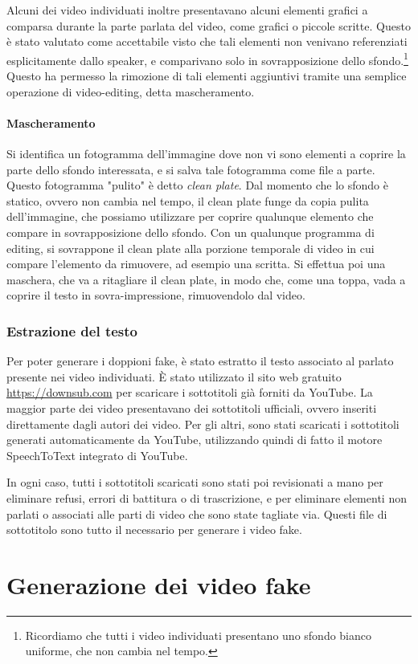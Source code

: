Alcuni dei video individuati inoltre presentavano alcuni elementi grafici a comparsa durante la parte parlata del video, come grafici o piccole scritte. Questo è stato valutato come accettabile visto che tali elementi non venivano referenziati esplicitamente dallo speaker, e comparivano solo in sovrapposizione dello sfondo.\footnote{Ricordiamo che tutti i video individuati presentano uno sfondo bianco uniforme, che non cambia nel tempo.} Questo ha permesso la rimozione di tali elementi aggiuntivi tramite una semplice operazione di video-editing, detta mascheramento.

\paragraph{Mascheramento}

Si identifica un fotogramma dell'immagine dove non vi sono elementi a coprire la parte dello sfondo interessata, e si salva tale fotogramma come file a parte. Questo fotogramma "pulito" è detto \textit{clean plate}. Dal momento che lo sfondo è statico, ovvero non cambia nel tempo, il clean plate funge da copia pulita dell'immagine, che possiamo utilizzare per coprire qualunque elemento che compare in sovrapposizione dello sfondo. Con un qualunque programma di editing, si sovrappone il clean plate alla porzione temporale di video in cui compare l'elemento da rimuovere, ad esempio una scritta. Si effettua poi una maschera, che va a ritagliare il clean plate, in modo che, come una toppa, vada a coprire il testo in sovra-impressione, rimuovendolo dal video.


\subsubsection{Estrazione del testo}

Per poter generare i doppioni fake, è stato estratto il testo associato al parlato presente nei video individuati. È stato utilizzato il sito web gratuito \url{https://downsub.com} per scaricare i sottotitoli già forniti da YouTube. La maggior parte dei video presentavano dei sottotitoli ufficiali, ovvero inseriti direttamente dagli autori dei video. Per gli altri, sono stati scaricati i sottotitoli generati automaticamente da YouTube, utilizzando quindi di fatto il motore SpeechToText integrato di YouTube.

In ogni caso, tutti i sottotitoli scaricati sono stati poi revisionati a mano per eliminare refusi, errori di battitura o di trascrizione, e per eliminare elementi non parlati o associati alle parti di video che sono state tagliate via. Questi file di sottotitolo sono tutto il necessario per generare i video fake.

\section{Generazione dei video fake}

\clearpage